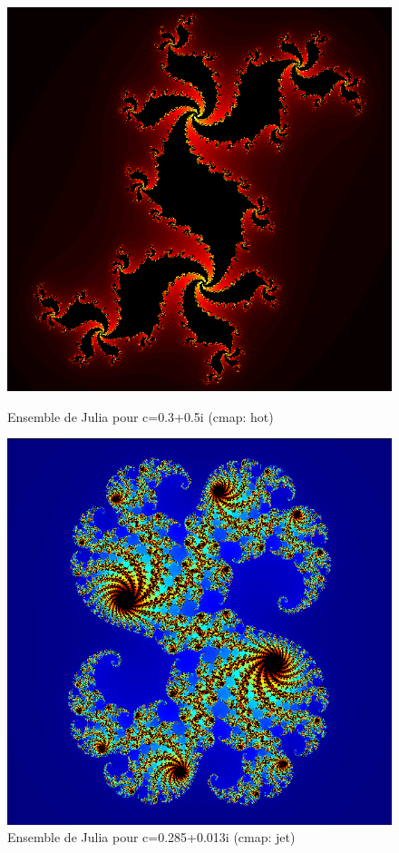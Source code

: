             \begin{figure}[h]
                \centering
                \begin{minipage}[b]{0.45\textwidth}
                    \includegraphics[width=\textwidth]{images/julia(c=(0.300000,0.500000xi)).png}
                    \caption{Ensemble de Julia pour c=0.3+0.5i (cmap: hot)}
                    \label{fig:julia1}
                \end{minipage}
                \hfill
                \begin{minipage}[b]{0.45\textwidth}
                    \includegraphics[width=\textwidth]{images/julia(c=(0.285000,0.013000xi)).png}
                    \caption{Ensemble de Julia pour c=0.285+0.013i (cmap: jet)}
                    \label{fig:julia2}
                \end{minipage}
            \end{figure}
